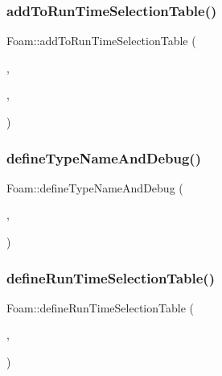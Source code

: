 \mbox{\label{namespaceFoam_a27a0ed89212123d1793fe7e592eb1460}} 
\subsubsection{\texorpdfstring{add\+To\+Run\+Time\+Selection\+Table()}{addToRunTimeSelectionTable()}\hspace{0.1cm}{\footnotesize\ttfamily [2/6]}}
{\footnotesize\ttfamily Foam\+::add\+To\+Run\+Time\+Selection\+Table (\begin{DoxyParamCaption}\item[{\hyperlink{classFoam_1_1neutronics}{neutronics}}]{,  }\item[{\hyperlink{classFoam_1_1diffusionNeutronics}{diffusion\+Neutronics}}]{,  }\item[{dictionary}]{ }\end{DoxyParamCaption})}

\mbox{\label{namespaceFoam_aa186014f9a072e56a0675c5bf4756389}} 
\subsubsection{\texorpdfstring{define\+Type\+Name\+And\+Debug()}{defineTypeNameAndDebug()}\hspace{0.1cm}{\footnotesize\ttfamily [4/50]}}
{\footnotesize\ttfamily Foam\+::define\+Type\+Name\+And\+Debug (\begin{DoxyParamCaption}\item[{\hyperlink{classFoam_1_1neutronics}{neutronics}}]{,  }\item[{0}]{ }\end{DoxyParamCaption})}

\mbox{\label{namespaceFoam_aa6c5e0f36dbb719b090926fb292c1867}} 
\subsubsection{\texorpdfstring{define\+Run\+Time\+Selection\+Table()}{defineRunTimeSelectionTable()}\hspace{0.1cm}{\footnotesize\ttfamily [1/28]}}
{\footnotesize\ttfamily Foam\+::define\+Run\+Time\+Selection\+Table (\begin{DoxyParamCaption}\item[{\hyperlink{classFoam_1_1neutronics}{neutronics}}]{,  }\item[{dictionary}]{ }\end{DoxyParamCaption})}

